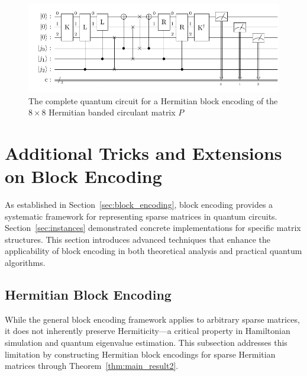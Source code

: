 \documentclass{article}
\begin{document}
    \begin{figure}[htbp]
        \centering
        \includegraphics{pdf/direct_encode}
        \caption{
            The complete quantum circuit for a Hermitian block encoding of the $8\times 8$
            Hermitian banded circulant matrix $P$
        }
        \label{fig:direct_circuit}
    \end{figure}


    \section{Additional Tricks and Extensions on Block Encoding}

    As established in Section~\ref{sec:block_encoding}, block encoding provides a systematic framework for representing sparse matrices in quantum circuits. Section~\ref{sec:instances} demonstrated concrete implementations for specific matrix structures. This section introduces advanced techniques that enhance the applicability of block encoding in both theoretical analysis and practical quantum algorithms.

    \subsection{Hermitian Block Encoding}

    While the general block encoding framework applies to arbitrary sparse matrices, it does not inherently preserve Hermiticity—a critical property in Hamiltonian simulation and quantum eigenvalue estimation. This subsection addresses this limitation by constructing Hermitian block encodings for sparse Hermitian matrices through Theorem~\ref{thm:main_result2}.
\end{document}
